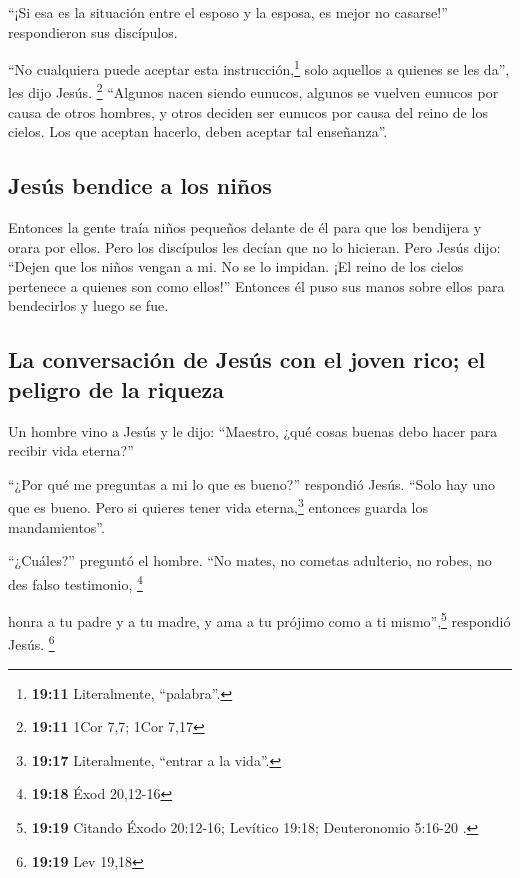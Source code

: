  ``¡Si esa es la situación entre el esposo y la esposa,
es mejor no casarse!'' respondieron sus discípulos.

 ``No cualquiera puede aceptar esta
instrucción,\footnote{\textbf{19:11} Literalmente, ``palabra''.} solo
aquellos a quienes se les da'', les dijo Jesús. \footnote{\textbf{19:11}
  1Cor 7,7; 1Cor 7,17}  ``Algunos nacen siendo eunucos,
algunos se vuelven eunucos por causa de otros hombres, y otros deciden
ser eunucos por causa del reino de los cielos. Los que aceptan hacerlo,
deben aceptar tal enseñanza''.

\hypertarget{jesuxfas-bendice-a-los-niuxf1os}{%
\subsection{Jesús bendice a los
niños}\label{jesuxfas-bendice-a-los-niuxf1os}}

 Entonces la gente traía niños pequeños delante de él
para que los bendijera y orara por ellos. Pero los discípulos les decían
que no lo hicieran.  Pero Jesús dijo: ``Dejen que los
niños vengan a mi. No se lo impidan. ¡El reino de los cielos pertenece a
quienes son como ellos!''  Entonces él puso sus manos
sobre ellos para bendecirlos y luego se fue.

\hypertarget{la-conversaciuxf3n-de-jesuxfas-con-el-joven-rico-el-peligro-de-la-riqueza}{%
\subsection{La conversación de Jesús con el joven rico; el peligro de la
riqueza}\label{la-conversaciuxf3n-de-jesuxfas-con-el-joven-rico-el-peligro-de-la-riqueza}}

 Un hombre vino a Jesús y le dijo: ``Maestro, ¿qué cosas
buenas debo hacer para recibir vida eterna?''

 ``¿Por qué me preguntas a mi lo que es bueno?''
respondió Jesús. ``Solo hay uno que es bueno. Pero si quieres tener vida
eterna,\footnote{\textbf{19:17} Literalmente, ``entrar a la vida''.}
entonces guarda los mandamientos''.

 ``¿Cuáles?'' preguntó el hombre. ``No mates, no cometas
adulterio, no robes, no des falso testimonio, \footnote{\textbf{19:18}
  Éxod 20,12-16}

 honra a tu padre y a tu madre, y ama a tu prójimo como a
ti mismo'',\footnote{\textbf{19:19} Citando Éxodo 20:12-16; Levítico
  19:18; Deuteronomio 5:16-20 .} respondió Jesús. \footnote{\textbf{19:19}
  Lev 19,18}

